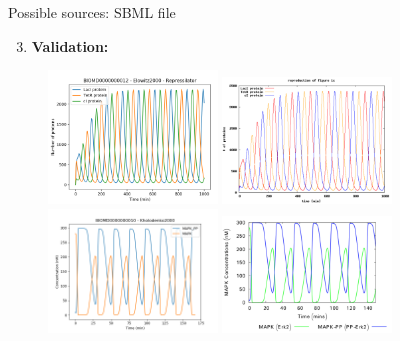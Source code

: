 \documentclass{beamer}
\begin{document}
\begin{frame}{Possible sources: SBML file}
\begin{enumerate} 
\setcounter{enumi}{2}
\item \textbf{Validation:}
\end{enumerate}
\begin{figure}[h!]
\centering
\includegraphics[width=0.40\textwidth]{BIOMD0000000012.png}
\includegraphics[width=0.40\textwidth]{Curated-BIOMD0000000012.png} \\
\includegraphics[width=0.40\textwidth]{BIOMD0000000010.png}
\includegraphics[width=0.40\textwidth]{Curated-BIOMD0000000010.png}
\end{figure}

\end{frame}
\end{document}
